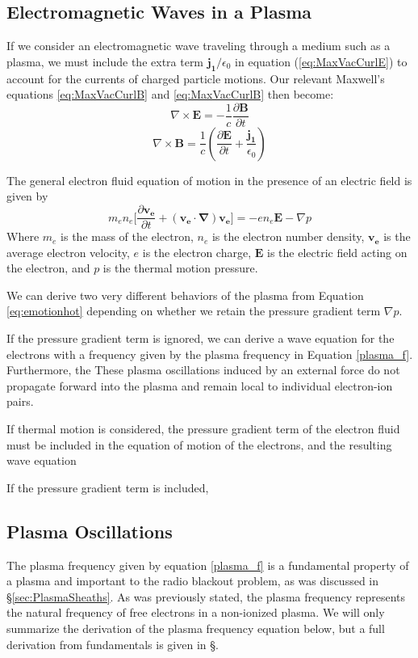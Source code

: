 \documentclass[twocolumn]{article}
\begin{document}
\subsection{Electromagnetic Waves in a Plasma}
If we consider an electromagnetic wave traveling through a medium such as a plasma, we must include the extra term $\mathbf{j_1}/\epsilon_0$ in equation (\ref{eq:MaxVacCurlE}) to account for the currents of charged particle motions.
Our relevant Maxwell's equations \ref{eq:MaxVacCurlB} and \ref{eq:MaxVacCurlB} then become:
\begin{equation}
	\label{eq:MaxPlasCurlE}
	\nabla \times \mathbf{E} = -\frac{1}{c} \frac{\partial \mathbf{B}}{\partial t}
\end{equation}
\begin{equation}
	\label{eq:MaxPlasCurlB}
	\nabla \times \mathbf{B} = \frac{1}{c} (\frac{\partial \mathbf{E}}{\partial t} + \frac{\mathbf{j_1}}{\epsilon_0})
\end{equation}

The general electron fluid equation of motion in the presence of an electric field is given by
\begin{equation} \label{eq:emotionhot}
m_en_e \lbrack \frac{\partial \mathbf{v_e}}{\partial t} + \left( \mathbf{v_e} \cdot \mathbf{\nabla} \right) \mathbf{v_e} \rbrack = -en_e\mathbf{E} - \nabla p
\end{equation}
Where $m_e$ is the mass of the electron, $n_e$ is the electron number density, $\mathbf{v_e}$ is the average electron velocity, $e$ is the electron charge, $\mathbf{E}$ is the electric field acting on the electron, and $p$ is the thermal motion pressure.

We can derive two very different behaviors of the plasma from Equation \ref{eq:emotionhot} depending on whether we retain the pressure gradient term $\nabla p$.

If the pressure gradient term is ignored, we can derive a wave equation for the electrons with a frequency given by the plasma frequency in Equation \ref{plasma_f}.
Furthermore, the 
These plasma oscillations induced by an external force do not propagate forward into the plasma and remain local to individual electron-ion pairs.

If thermal motion is considered, the pressure gradient term of the electron fluid must be included in the equation of motion of the electrons, and the resulting wave equation 


If the pressure gradient term is included, 
\subsection*{Plasma Oscillations}
The plasma frequency given by equation \ref{plasma_f} is a fundamental property of a plasma and important to the radio blackout problem, as was discussed in \S\ref{sec:PlasmaSheaths}.
As was previously stated, the plasma frequency represents the natural frequency of free electrons in a non-ionized plasma.
We will only summarize the derivation of the plasma frequency equation below, but a full derivation from fundamentals is given in \S\cite{chen_introduction_1984}.
\end{document}
